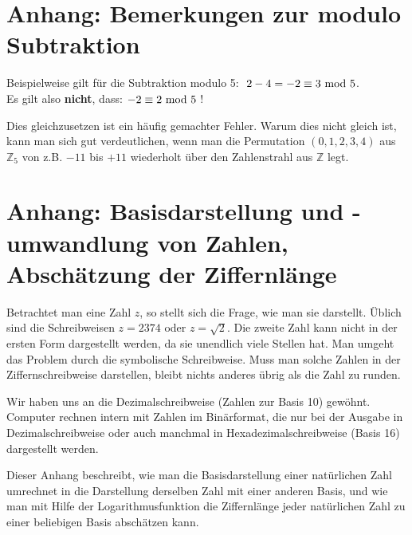 \begin{refsegment}
\hypertarget{nt:NumberTheory_Appendix_C}{}
\section{Anhang: Bemerkungen zur modulo Subtraktion}
\label{nt:NumberTheory_Appendix_C}{}

Beispielweise gilt für die Subtraktion modulo 5: $~2 - 4 = -2 \equiv
3{\rm ~mod~}5$.\\
Es gilt also \textbf{nicht}, dass: $-2 \equiv 2 {\rm ~mod~} 5$ !

Dies gleichzusetzen ist ein häufig gemachter Fehler.
Warum dies nicht gleich ist, kann man sich gut verdeutlichen, wenn man die
Permutation $(0, 1, 2, 3, 4)$ aus $\mathbb{Z}_5$ von z.B. $-11$ bis $+11$
wiederholt über den Zahlenstrahl aus $\mathbb{Z}$ legt.





\hypertarget{NumberTheory_Appendix_D}{}
\section[Anhang: Basisdarstellung von Zahlen, Abschätzung der Ziffernlänge]
        {Anhang: Basisdarstellung und -umwandlung von Zahlen, Abschätzung der Ziffernlänge}
\label{l:NumberTheory_Appendix_D}{}

Betrachtet man eine Zahl $z$, so stellt sich die Frage, wie man sie
darstellt.  Üblich sind die Schreibweisen $z = 2374$ oder $z = \sqrt{2}$.
Die zweite Zahl kann nicht in der ersten Form dargestellt werden, da sie
unendlich viele Stellen hat.
Man umgeht das Problem durch die symbolische Schreibweise. Muss man solche
Zahlen in der Ziffernschreibweise darstellen, bleibt nichts anderes übrig
als die Zahl zu runden.

Wir haben uns an die Dezimalschreibweise (Zahlen zur Basis 10) gewöhnt.
Computer rechnen intern mit Zahlen im Binärformat, die nur bei der Ausgabe
in Dezimalschreibweise oder auch manchmal in Hexadezimalschreibweise (Basis 16)
dargestellt werden.

Dieser Anhang beschreibt, wie man die Basisdarstellung einer natürlichen Zahl
umrechnet in die Darstellung derselben Zahl mit einer anderen Basis,
und wie man mit Hilfe der Logarithmusfunktion die Ziffernlänge jeder
natürlichen Zahl zu einer beliebigen Basis abschätzen kann.



\end{refsegment}
